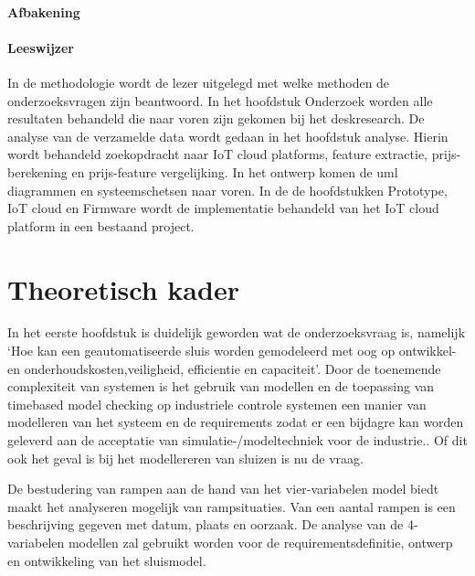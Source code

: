 \documentclass{article}
\begin{document}
	\paragraph{Afbakening}
	
	\paragraph{Leeswijzer}
	In  de methodologie wordt de lezer uitgelegd met welke methoden de onderzoeksvragen zijn beantwoord. In het hoofdstuk Onderzoek worden alle resultaten behandeld die naar voren zijn gekomen bij het deskresearch. De analyse van de verzamelde data wordt gedaan in het hoofdstuk analyse. Hierin wordt behandeld zoekopdracht naar IoT cloud platforms, feature extractie, prijs-berekening en prijs-feature vergelijking. In het ontwerp komen de uml diagrammen en systeemschetsen naar voren. In de  de hoofdstukken Prototype, IoT cloud en Firmware wordt de implementatie behandeld van het IoT cloud platform in een bestaand project.
	
	
	
	
	
	
	
	
	\section{Theoretisch kader}
	In het eerste hoofdstuk is duidelijk geworden wat de onderzoeksvraag is, namelijk ‘Hoe kan een geautomatiseerde sluis worden gemodeleerd met oog op ontwikkel- en onderhoudskosten,veiligheid, efficientie en capaciteit’. Door de toenemende complexiteit van systemen is het gebruik van modellen en de toepassing van timebased model checking  op industriele controle systemen een manier van modelleren van het systeem en de requirements zodat er een bijdagre kan worden geleverd aan de acceptatie van  simulatie-/modeltechniek voor de industrie.\cite{RijnensupervisorsynthesisLock}. Of dit ook het geval is bij het modellereren van sluizen is nu de vraag.
	
	De bestudering van rampen aan de hand van het vier-variabelen model biedt maakt het analyseren mogelijk van rampsituaties. Van een aantal rampen is een beschrijving gegeven met datum, plaats en oorzaak. De analyse van de 4-variabelen modellen zal gebruikt worden voor de requirementsdefinitie, ontwerp en ontwikkeling van het sluismodel. 
	
\end{document}
